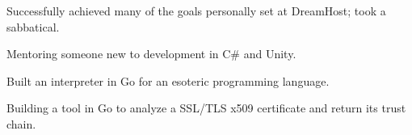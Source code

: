 \item Successfully achieved many of the goals personally set at DreamHost; took a sabbatical.
\item Mentoring someone new to development in C\# and Unity.
\item Built an interpreter in Go for an esoteric programming language. %
\item Building a tool in Go to analyze a SSL/TLS x509 certificate and return its trust chain.
